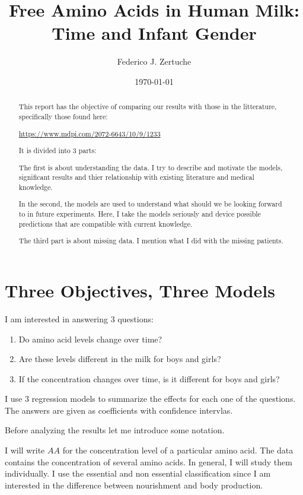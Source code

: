 \documentclass[12pt]{article}
\title{Free Amino Acids in Human Milk: Time and Infant Gender}
\author{Federico J. Zertuche}
\date{\today}
\begin{document}
\maketitle

\begin{abstract}
This report has the objective of comparing our results with those in the litterature, specifically those found here:

\begin{center}
  \href{https://www.mdpi.com/2072-6643/10/9/1233}{https://www.mdpi.com/2072-6643/10/9/1233}
\end{center}

It is divided into $3$ parts:

The first is about understanding the data. I try to describe and motivate the models, significant results and thier relationship with existing literature and medical knowledge.

In the second, the models are used to understand what should we be looking forward to in future experiments. Here, I take the models seriously and device possible predictions that are compatible with current knowledge.

The third part is about missing data. I mention what I did with the missing patients.

\end{abstract}

\part{Three Objectives, Three Models}

I am interested in answering $3$ questions:

\begin{enumerate}
  \item Do amino acid levels change over time?
  \item Are these levels different in the milk for boys and girls?
  \item If the concentration changes over time, is it different for boys and girls?
\end{enumerate}

I use $3$ regression models to summarize the effects for each one of the questions. The answers are given as coefficients with confidence intervlas.

Before analyzing the results let me introduce some notation.

I will write $AA$ for the concentration level of a particular amino acid. The data contains the concentration of several amino acids. In general, I will study them individually. I use the essential and non essential classification since I am interested in the difference between nourishment and body production.
\end{document}

